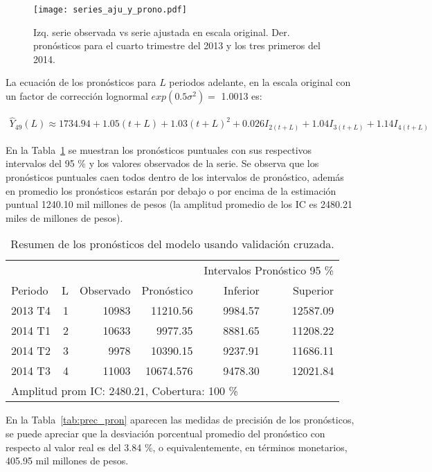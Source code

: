 \documentclass[11pt, letterpaper, twoside]{article}
\begin{document}
\begin{figure}[ht!]
\centering
\texttt{[image: series\_aju\_y\_prono.pdf]}
\caption{Izq. serie observada vs serie ajustada en escala original. Der. pronósticos para el cuarto trimestre del 2013 y los tres primeros del 2014.}
\label{fig:series_aju_y_prono}
\end{figure}

La ecuación de los pronósticos para $L$ periodos adelante, en la escala original con un factor de corrección lognormal $exp(0.5\sigma^2)=$ 1.0013 es:

\begin{align}
\label{eq:mod_aju_pron}
\hat{Y}_{49}(L) \approx 1734.94+1.05 (t+L) + 1.03 (t + L)^2 + 0.026 I_{2(t+L)} + 1.04 I_{3(t+L)} + 1.14 I_{4(t+L)}
\end{align}

En la Tabla~\ref{tab:pron_mod_aju} se muestran los pronósticos puntuales con sus respectivos intervalos del 95 \% y los valores observados de la serie. Se observa que los pronósticos puntuales caen todos dentro de los intervalos de pronóstico, además en promedio los pronósticos estarán por debajo o por encima de la estimación puntual 1240.10 mil millones de pesos (la amplitud promedio de los IC es 2480.21 miles de millones de pesos).

\begin{table}[ht!]
\caption{Resumen de los pronósticos del modelo usando validación cruzada.}
\label{tab:pron_mod_aju}
\centering
\begin{tabular}{lrrrrr}
& & & & \multicolumn{2}{c}{Intervalos Pronóstico 95 \%} \\
Periodo & L & Observado & Pronóstico & Inferior & Superior \\
\hline
2013 T4 & 1 & 10983 & 11210.56 & 9984.57 & 12587.09 \\
2014 T1 & 2 & 10633 & 9977.35 & 8881.65 & 11208.22 \\
2014 T2 & 3 & 9978 & 10390.15 & 9237.91 & 11686.11 \\
2014 T3 & 4 & 11003 & 10674.576 & 9478.30 & 12021.84 \\
\hline
\multicolumn{6}{l}{Amplitud prom IC: 2480.21, Cobertura: 100 \%} \\
\hline
\end{tabular}
\end{table}

En la Tabla~\ref{tab:prec_pron} aparecen las medidas de precisión de los pronósticos, se puede apreciar que la desviación porcentual promedio del pronóstico con respecto al valor real es del 3.84 \%, o equivalentemente, en términos monetarios, 405.95 mil millones de pesos.
\end{document}
